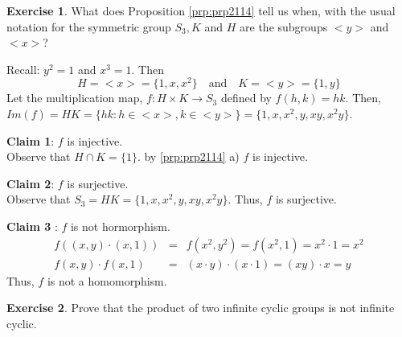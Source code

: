 \documentclass[
]{book}
\theoremstyle{definition}
\theoremstyle{definition}
\theoremstyle{definition}
\newtheorem{exercise}{Exercise}[chapter]
\theoremstyle{definition}
\theoremstyle{remark}
\begin{document}
\hfill\break
\hfill\break
\hfill\break

\begin{exercise}
\protect\hypertarget{exr:unnamed-chunk-61}{}\label{exr:unnamed-chunk-61}What does Proposition \ref{prp:prp2114} tell us when, with the usual notation for the symmetric
group \(S_3,K\) and \(H\) are the subgroups \(<y>\) and \(<x>\)?
\end{exercise}

Recall: \(y^2=1\) and \(x^3=1\). Then
\[H=<x>=\{1,x,x^2\}~~~\text{ and }~~~ K=<y>=\{1,y\}\]
Let the multiplication map, \(f:H\times K \to S_3\) defined by \(f(h,k)=hk\). Then,
\(Im(f)=HK=\{hk:h\in <x>, k\in <y>\}=\{1,x,x^2,y,xy,x^2y\}\).

\textbf{Claim 1}: \(f\) is injective.\\
Observe that \(H \cap K=\{1\}\). by \ref{prp:prp2114} a) \(f\) is injective.

\textbf{Claim 2}: \(f\) is surjective.\\
Observe that \(S_3=HK=\{1,x,x^2,y,xy,x^2y\}\). Thus, \(f\) is surjective.

\textbf{Claim 3} : \(f\) is not hormorphism.\\
\begin{eqnarray}
f((x,y)\cdot (x,1))&=& f(x^2,y^2)=f(x^2,1)=x^2\cdot 1=x^2\\
f(x,y)\cdot f(x,1)&=& (x\cdot y)\cdot (x\cdot 1)=(xy)\cdot x=y
\end{eqnarray}
Thus, \(f\) is not a homomorphism.

\begin{exercise}
\protect\hypertarget{exr:unnamed-chunk-62}{}\label{exr:unnamed-chunk-62}Prove that the product of two infinite cyclic groups is not infinite cyclic.
\end{exercise}
\end{document}
